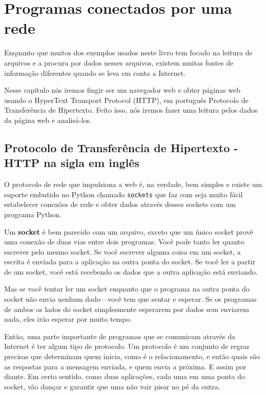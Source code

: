 
\chapter{Programas conectados por uma rede}

Enquanto que muitos dos exemplos usados neste livro tem focado na leitura
de arquivos e a procura por dados nesses arquivos, existem muitas fontes
de informação diferentes quando se leva em conta a Internet.

Nesse capítulo nós iremos fingir ser um navegador web e obter páginas
web usando o HyperText Transport Protocol (HTTP), em português Protocolo
de Transferência de Hipertexto.  Feito isso, nós iremos fazer uma leitura
pelos dados da página web e analisá-los.

\section{Protocolo de Transferência de Hipertexto - HTTP na sigla em inglês}

O protocolo de rede que impulsiona a web é, na verdade, bem simples e 
existe um suporte embutido no Python chamado {\tt sockets} que faz com seja
muito fácil estabelecer conexões de rede e obter dados através desses
sockets com um programa Python.

Um {\bf socket} é bem parecido com um arquivo, exceto que um único socket 
provê uma conexão de duas vias entre dois programas.  Você pode tanto ler
quanto escrever pelo mesmo socket.  Se você escrever alguma coisa em um
socket, a escrita é enviada para a aplicação na outra ponta do socket.
Se você ler a partir de um socket, você está recebendo os dados que a outra
aplicação está enviando.

Mas se você tentar ler um socket enquanto que o programa na outra ponta do
socket não envia nenhum dado---você tem que sentar e esperar.  Se os
programas de ambos os lados do socket simplesmente esperarem por dados sem
enviarem nada, eles irão esperar por muito tempo.

Então, uma parte importante de programas que se comunicam através da Internet
é ter algum tipo de protocolo.  Um protocolo é um conjunto de regras precisas
que determinam quem inicia, como é o relacionamento, e então quais são as
respostas para a mensagem enviada, e quem envia a próxima. E assim por diante.
Em certo sentido, como duas aplicações, cada uma em uma ponta do socket, vão
dançar e garantir que uma não vair pisar no pé da outra.

